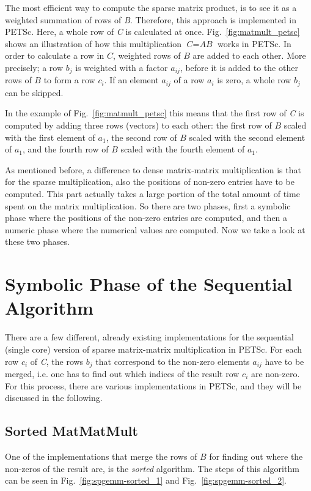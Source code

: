 The most efficient way to compute the sparse matrix product, is to see it as a weighted summation of rows of \textit{B}. Therefore, this approach is implemented in PETSc. Here, a whole row of \textit{C} is calculated at once. Fig.~\ref{fig:matmult_petsc} shows an illustration of how this multiplication $\textit{C} = \textit{AB}$ works in PETSc. In order to calculate a row in $\textit{C}$, weighted rows of $B$ are added to each other. More precisely; a row $b_j$ is weighted with a factor $a_{ij}$, before it is added to the other rows of $B$ to form a row $c_i$. If an element $a_{ij}$ of a row $a_i$ is zero, a whole row $b_j$ can be skipped. 

In the example of Fig.~\ref{fig:matmult_petsc} this means that the first row of \textit{C} is computed by adding three rows (vectors) to each other: the first row of $B$ scaled with the first element of $a_1$, the second row of $\textit{B}$ scaled with the second element of $a_1$, and the fourth row of $B$ scaled with the fourth element of $a_1$.


As mentioned before, a difference to dense matrix-matrix multiplication is that for the sparse multiplication, also the positions of non-zero entries have to be computed. This part actually takes a large portion of the total amount of time spent on the matrix multiplication. So there are two phases, first a symbolic phase where the positions of the non-zero entries are computed, and then a numeric phase where the numerical values are computed. Now we take a look at these two phases.



\section{Symbolic Phase of the Sequential Algorithm}
There are a few different, already existing implementations for the sequential (single core) version of sparse matrix-matrix multiplication in PETSc. For each row $c_i$ of \textit{C}, the rows $b_j$ that correspond to the non-zero elements $a_{ij}$ have to be merged, i.e. one has to find out which indices of the result row $c_i$ are non-zero. For this process, there are various implementations in PETSc, and they will be discussed in the following.


\subsection{Sorted MatMatMult}
One of the implementations that merge the rows of $B$ for finding out where the non-zeros of the result are, is the \textit{sorted} algorithm. The steps of this algorithm can be seen in Fig.~\ref{fig:spgemm-sorted_1} and Fig.~\ref{fig:spgemm-sorted_2}.

